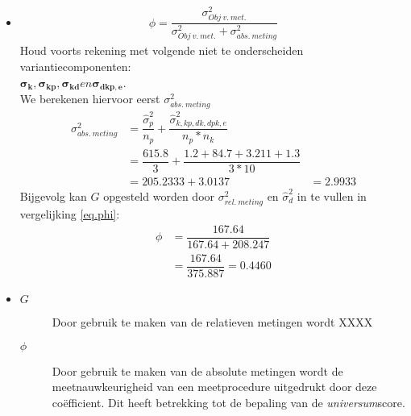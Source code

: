 {\begin{enumerate}
\begin{itemize}
	\item
	\begin{align}
		\phi =\dfrac{\sigma^2_{Obj~v.~met.}}{\sigma^2_{Obj~v.~met.}+ \sigma^2_{abs.~meting}} \label{eq.phi}
	\end{align}
	Houd voorts rekening met volgende niet te onderscheiden variantiecomponenten:~ \\
	$\bm{\sigma_k},\bm{\sigma_{kp}} , \bm{\sigma_{kd}} en \bm{\sigma_{dkp, e}}$.\\
	We berekenen hiervoor eerst $\sigma^2_{abs.~meting}$
	\begin{align*}
		\sigma^2_{abs.~meting} 	&=  \dfrac{\hat{\sigma}^2_{p}}{n_p} + \dfrac{\hat{\sigma}^2_{k, kp, dk, dpk, e}}{n_p*n_k} \\
								&=  \dfrac{{615.8}}{3} + \dfrac{{1.2 + 84.7 +  3.211 +1.3}}{3*10}\\
								&= 205.2333 + 3.0137 &=2.9933
	\end{align*}
	Bijgevolg kan $G$ opgesteld worden door $\sigma^2_{rel.~meting}$ en $\hat{\sigma}^2_{d}$ in te vullen in vergelijking \ref{eq.phi}:
	\begin{align*}
		\phi 	&=\dfrac{167.64}{167.64+ 208.247}\\
				&=\dfrac{167.64}{375.887}=0.4460
	\end{align*}
	\item \begin{description}
		\item[$G$] Door gebruik te maken van de relatieven metingen wordt XXXX
		\item[$\phi$] Door gebruik te maken van de absolute metingen wordt de meetnauwkeurigheid van een meetprocedure uitgedrukt door deze co\"efficient.
		Dit heeft betrekking tot de bepaling van de \emph{universum}score.
	\end{description}
\end{itemize}
\end{enumerate}
}
